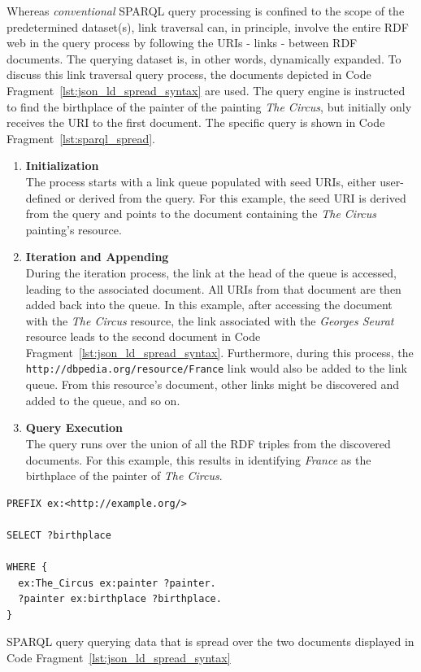 Whereas \textit{conventional} SPARQL query processing is confined to the scope of the predetermined dataset(s), link traversal can, in principle, involve the entire RDF web in the query process by following the URIs - links - between RDF documents. The querying dataset is, in other words, dynamically expanded. To discuss this link traversal query process, the documents depicted in Code Fragment~\ref{lst:json_ld_spread_syntax} are used. The query engine is instructed to find the birthplace of the painter of the painting \textit{The Circus}, but initially only receives the URI to the first document. The specific query is shown in Code Fragment~\ref{lst:sparql_spread}.
\begin{enumerate}
    \item \textbf{Initialization}\\
    The process starts with a link queue populated with seed URIs, either user-defined or derived from the query. For this example, the seed URI is derived from the query and points to the document containing the \textit{The Circus} painting's resource.
    \item \textbf{Iteration and Appending}\\
    During the iteration process, the link at the head of the queue is accessed, leading to the associated document. All URIs from that document are then added back into the queue. In this example, after accessing the document with the \textit{The Circus} resource, the link associated with the \textit{Georges Seurat} resource leads to the second document in Code Fragment~\ref{lst:json_ld_spread_syntax}. Furthermore, during this process, the \texttt{http://dbpedia.org/resource/France} link would also be added to the link queue. From this resource's document, other links might be discovered and added to the queue, and so on.
    \item \textbf{Query Execution}\\
    The query runs over the union of all the RDF triples from the discovered documents. For this example, this results in identifying \textit{France} as the birthplace of the painter of \textit{The Circus}.
\end{enumerate}
\citep{taelman2023ltqp}

\begin{listing}[htbp]
    \begin{verbatim}
PREFIX ex:<http://example.org/>

SELECT ?birthplace

WHERE {
  ex:The_Circus ex:painter ?painter.
  ?painter ex:birthplace ?birthplace.
}
    \end{verbatim}
    \caption{SPARQL query querying data that is spread over the two documents displayed in Code Fragment~\ref{lst:json_ld_spread_syntax}}
    \label{lst:sparql_spread}
\end{listing}

